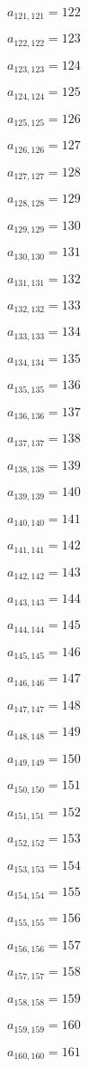 \documentclass[a4paper,12pt]{article}
\begin{document}
$a _{ 121, 121 } = 122$

$a _{ 122, 122 } = 123$

$a _{ 123, 123 } = 124$

$a _{ 124, 124 } = 125$

$a _{ 125, 125 } = 126$

$a _{ 126, 126 } = 127$

$a _{ 127, 127 } = 128$

$a _{ 128, 128 } = 129$

$a _{ 129, 129 } = 130$

$a _{ 130, 130 } = 131$

$a _{ 131, 131 } = 132$

$a _{ 132, 132 } = 133$

$a _{ 133, 133 } = 134$

$a _{ 134, 134 } = 135$

$a _{ 135, 135 } = 136$

$a _{ 136, 136 } = 137$

$a _{ 137, 137 } = 138$

$a _{ 138, 138 } = 139$

$a _{ 139, 139 } = 140$

$a _{ 140, 140 } = 141$

$a _{ 141, 141 } = 142$

$a _{ 142, 142 } = 143$

$a _{ 143, 143 } = 144$

$a _{ 144, 144 } = 145$

$a _{ 145, 145 } = 146$

$a _{ 146, 146 } = 147$

$a _{ 147, 147 } = 148$

$a _{ 148, 148 } = 149$

$a _{ 149, 149 } = 150$

$a _{ 150, 150 } = 151$

$a _{ 151, 151 } = 152$

$a _{ 152, 152 } = 153$

$a _{ 153, 153 } = 154$

$a _{ 154, 154 } = 155$

$a _{ 155, 155 } = 156$

$a _{ 156, 156 } = 157$

$a _{ 157, 157 } = 158$

$a _{ 158, 158 } = 159$

$a _{ 159, 159 } = 160$

$a _{ 160, 160 } = 161$
\end{document}
